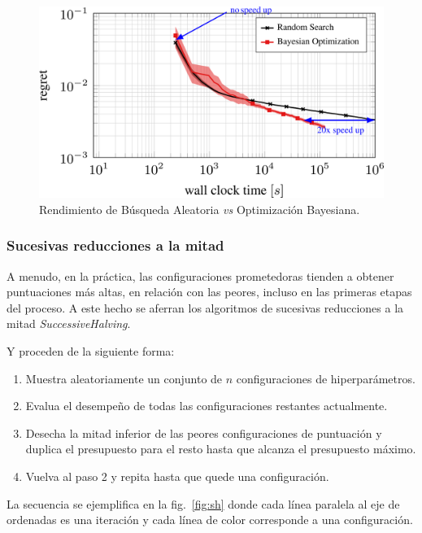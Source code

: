 \documentclass[a4paper,12pt]{article}
\begin{document}
\begin{figure}[H]
	\begin{center}
	\includegraphics[width=1\textwidth]{comparison_rs_bo.png}
  	\caption{Rendimiento de Búsqueda Aleatoria \textit{vs} Optimización Bayesiana.}
  	\label{fig:rs_vs_bo}
  	\end{center}
\end{figure}

\subsubsection{Sucesivas reducciones a la mitad}
A menudo, en la práctica, las configuraciones prometedoras tienden a obtener puntuaciones más altas, en relación con las peores, incluso en las primeras etapas del proceso. A este hecho se aferran los algoritmos de sucesivas reducciones a la mitad \textit{SuccessiveHalving}.

Y proceden de la siguiente forma:
\begin{enumerate}
	\item Muestra aleatoriamente un conjunto de $n$ configuraciones de hiperparámetros.
	\item Evalua el desempeño de todas las configuraciones restantes actualmente.
	\item Desecha la mitad inferior de las peores configuraciones de puntuación y duplica el presupuesto para el resto hasta que alcanza el presupuesto máximo.
	\item Vuelva al paso 2 y repita hasta que quede una configuración.
\end{enumerate}

La secuencia se ejemplifica en la fig.~\ref{fig:sh} donde cada línea paralela al eje de ordenadas es una iteración y cada línea de color corresponde a una configuración.
\end{document}
